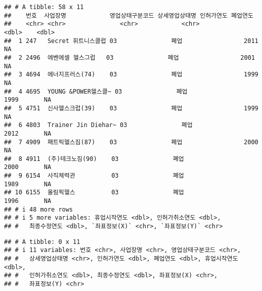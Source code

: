 \documentclass[
]{book}
\newenvironment{Shaded}{\begin{snugshade}}{\end{snugshade}}
\newcommand{\CommentTok}[1]{\textcolor[rgb]{0.56,0.35,0.01}{\textit{#1}}}
\newcommand{\FunctionTok}[1]{\textcolor[rgb]{0.00,0.00,0.00}{#1}}
\newcommand{\NormalTok}[1]{#1}
\newcommand{\OtherTok}[1]{\textcolor[rgb]{0.56,0.35,0.01}{#1}}
\newcommand{\SpecialCharTok}[1]{\textcolor[rgb]{0.00,0.00,0.00}{#1}}
\newcommand{\StringTok}[1]{\textcolor[rgb]{0.31,0.60,0.02}{#1}}
\begin{document}
\begin{verbatim}
## # A tibble: 58 x 11
##    번호  사업장명            영업상태구분코드 상세영업상태명 인허가연도 폐업연도
##    <chr> <chr>               <chr>            <chr>               <dbl>    <dbl>
##  1 247   Secret 휘트니스클럽 03               폐업                 2011       NA
##  2 2496  에벤에셀 헬스그럽   03               폐업                 2001       NA
##  3 4694  에너지프러스(74)    03               폐업                 1999       NA
##  4 4695  YOUNG &POWER헬스클~ 03               폐업                 1999       NA
##  5 4751  신사헬스크럽(39)    03               폐업                 1999       NA
##  6 4803  Trainer Jin Diehar~ 03               폐업                 2012       NA
##  7 4909  패트릭헬스짐(87)    03               폐업                 2000       NA
##  8 4911  (주)테크노짐(90)    03               폐업                 2000       NA
##  9 6154  사직체력관          03               폐업                 1989       NA
## 10 6155  올림픽헬스          03               폐업                 1996       NA
## # i 48 more rows
## # i 5 more variables: 휴업시작연도 <dbl>, 인허가취소연도 <dbl>,
## #   최종수정연도 <dbl>, `좌표정보(X)` <chr>, `좌표정보(Y)` <chr>
\end{verbatim}

\begin{Shaded}
\end{Shaded}

\begin{verbatim}
## # A tibble: 0 x 11
## # i 11 variables: 번호 <chr>, 사업장명 <chr>, 영업상태구분코드 <chr>,
## #   상세영업상태명 <chr>, 인허가연도 <dbl>, 폐업연도 <dbl>, 휴업시작연도 <dbl>,
## #   인허가취소연도 <dbl>, 최종수정연도 <dbl>, 좌표정보(X) <chr>,
## #   좌표정보(Y) <chr>
\end{verbatim}
\end{document}
